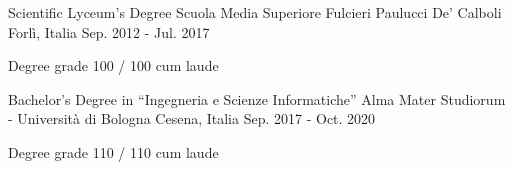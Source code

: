 

\begin{cventries}

  \cventry
  {Scientific Lyceum's Degree} %
  {Scuola Media Superiore Fulcieri Paulucci De' Calboli} %
  {Forlì, Italia} %
  {Sep. 2012 - Jul. 2017} %
  {
    \begin{cvitems} %
      \item {Degree grade 100 / 100 cum laude}
    \end{cvitems}
  }

  \cventry
    {Bachelor's Degree in ``Ingegneria e Scienze Informatiche''} %
    {Alma Mater Studiorum - Università di Bologna} %
    {Cesena, Italia} %
    {Sep. 2017 - Oct. 2020} %
    {
      \begin{cvitems} %
        \item {Degree grade 110 / 110 cum laude}
      \end{cvitems}
    }

\end{cventries}
